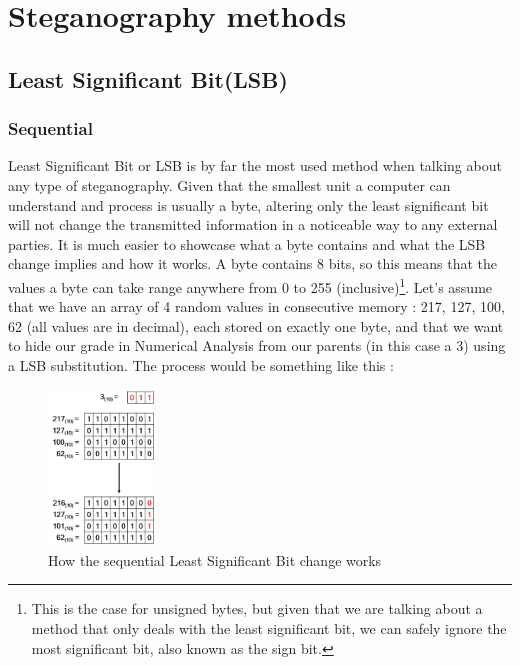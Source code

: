 
\chapter{Steganography methods}


\section{Least Significant Bit(LSB)}
\begin{multicols*}{2}
\subsection{Sequential}
\setlength\columnsep{20pt}

Least Significant Bit or LSB is by far the most used method when talking about any type of steganography. Given that the smallest unit a computer can understand and process is usually a byte, altering only the least significant bit will not change the transmitted information in a noticeable way to any external parties. It is much easier to showcase what a byte contains and what the LSB change implies and how it works. A byte contains 8 bits, so this means that the values a byte can take range anywhere from 0 to 255 (inclusive)\footnote{This is the case for unsigned bytes, but given that we are talking about a method that only deals with the least significant bit, we can safely ignore the most significant bit, also known as the sign bit.}. Let's assume that we have an array of 4 random values in consecutive memory : 217, 127, 100, 62 (all values are in decimal), each stored on exactly one byte, and that we want to hide our grade in Numerical Analysis from our parents (in this case a 3) using a LSB substitution. The process would be something like this :

\begin{figure}[H]
    \centering
    \includegraphics[width=2.8cm,keepaspectratio]{pics/how_lsb_works}
    \caption{How the sequential Least Significant Bit change works}
    \label{LSB}
\end{figure}


\end{multicols*}
